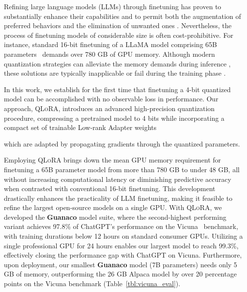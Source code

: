 Refining large language models (LLMs) through finetuning has proven to substantially enhance their capabilities \citep{min2021metaicl, wei2021finetuned, ouyang2022training, wang2022super, wang2022self, liu2022few} and to permit both the augmentation of preferred behaviors and the elimination of unwanted ones \citep{ouyang2022training,askell2021general,bai2022training}. Nevertheless, the process of finetuning models of considerable size is often cost-prohibitive. For instance, standard 16-bit finetuning of a LLaMA model comprising 65B parameters~\citep{touvron2023llama} demands over 780 GB of GPU memory. Although modern quantization strategies can alleviate the memory demands during inference \citep{dettmers2022llm, dettmers2022case, frantar2022gptq, xiao2022smoothquant}, these solutions are typically inapplicable or fail during the training phase \citep{wortsman2023stable}.

In this work, we establish for the first time that finetuning a 4-bit quantized model can be accomplished with no observable loss in performance. Our approach, \textsc{QLoRA}, introduces an advanced high-precision quantization procedure, compressing a pretrained model to 4 bits while incorporating a compact set of trainable Low-rank Adapter weights \citep{hu2021lora} 

which are adapted by propagating gradients through the quantized parameters.

Employing \textsc{QLoRA} brings down the mean GPU memory requirement for finetuning a 65B parameter model from more than 780 GB to under 48 GB, all without increasing computational latency or diminishing predictive accuracy when contrasted with conventional 16-bit finetuning. This development drastically enhances the practicality of LLM finetuning, making it feasible to refine the largest open-source models on a single GPU. With \textsc{QLoRA}, we developed the \textbf{Guanaco} model suite, where the second-highest performing variant achieves 97.8\% of ChatGPT’s performance on the Vicuna~\citep{vicuna2023} benchmark, with training durations below 12 hours on standard consumer GPUs. Utilizing a single professional GPU for 24 hours enables our largest model to reach 99.3\%, effectively closing the performance gap with ChatGPT on Vicuna. Furthermore, upon deployment, our smallest \textbf{Guanaco} model (7B parameters) needs only 5 GB of memory, outperforming the 26 GB Alpaca model by over 20 percentage points on the Vicuna benchmark (Table~\ref{tbl:vicuna_eval}).

